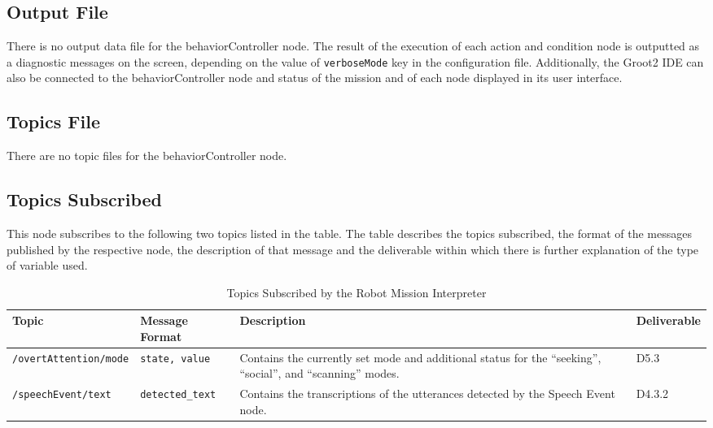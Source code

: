 \documentclass{CSSRforAfrica}
\begin{document}
\subsection{Output File}

There is no output data file for the behaviorController node. The result of the execution of each action and condition node is outputted as a diagnostic messages on the screen, depending on the value of \texttt{\small verboseMode} key in the configuration file.
Additionally, the Groot2 IDE can also be connected to the behaviorController node and status of the mission and of each node displayed in its user interface.

\subsection{Topics File}
There are no topic files for the behaviorController node.

\newpage
\subsection{Topics Subscribed}
This node subscribes to the following two topics listed in the table. The table describes the topics subscribed, the format of the messages published by the respective node, the description of that message and the deliverable within which there is further explanation of the type of variable used.

\begin{longtable}[c]{|l|p{3cm}|p{4.4cm}|l|}
    \caption{Topics Subscribed by the Robot Mission Interpreter} \label{tab:topic_messages}\\
    \hline
    \rowcolor{gray!30}
    \small{\textnormal{Topic}} & \small{\textnormal{Message Format}} & \small{\textnormal{Description}} & \small{\textnormal{Deliverable}}  \\ \hline
    \endfirsthead

    \small{\texttt{\small /overtAttention/mode}} & 
    \small{\texttt{\small state, value}} & 
    \small{Contains the currently set mode and additional status for the ``seeking'', ``social'', and ``scanning'' modes.} &
    \small{D5.3} \\ \hline

    \small{\texttt{\small /speechEvent/text}} & 
    \small{\texttt{\small detected\_text}} & 
    \small{Contains the transcriptions of the utterances detected by the Speech Event node.} &
    \small{D4.3.2} \\ \hline
\end{longtable}
\end{document}
